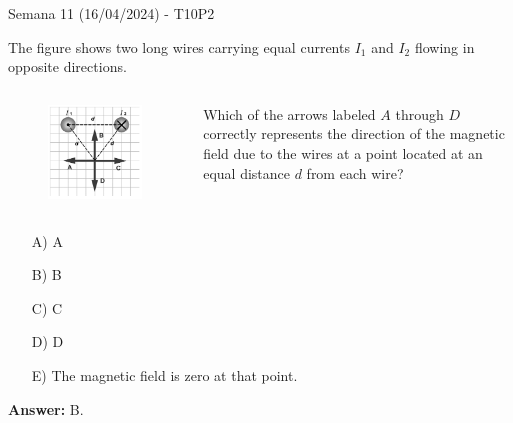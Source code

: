 \begin{frame}{Semana 11 (16/04/2024) - T10P2}
    
    The figure shows two long wires carrying equal currents $I_1$ and $I_2$ flowing in opposite directions.
    
    \begin{columns}
    \begin{figure}
        \centering
        \includegraphics[scale=0.4]{figures/t10p2.png}
    \end{figure}
    Which of the arrows labeled $A$ through $D$ correctly represents the direction of the magnetic field due to the wires at a point located at an equal distance $d$ from each wire?
    \end{columns}
    
    
    \begin{itemize}
        \item[A)] A
        \item[B)] B
        \item[C)] C
        \item[D)] D
        \item[E)] The magnetic field is zero at that point.
    \end{itemize}
    
     \pause \centering \textbf{Answer:} B.
    
\end{frame}

